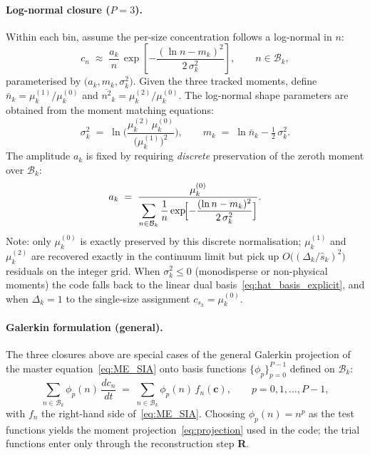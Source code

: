 \paragraph{Log-normal closure ($P{=}3$).}
\label{sec:lognormal_closure}
Within each bin, assume the per-size concentration follows a
log-normal in $n$:
\begin{equation}\label{eq:lognormal_ansatz}
    c_n
    \;\approx\;
    \frac{a_k}{n}\,\exp\!\left[
      -\frac{(\ln n - m_k)^2}{2\,\sigma_k^2}
    \right],
    \qquad n \in \mathcal{B}_k,
\end{equation}
parameterised by $\bigl(a_k, m_k, \sigma_k^2\bigr)$. Given the three
tracked moments, define
$\bar{n}_k = \mu_k^{(1)}/\mu_k^{(0)}$ and
$\overline{n^2}_k = \mu_k^{(2)}/\mu_k^{(0)}$. The log-normal shape
parameters are obtained from the moment matching equations:
\begin{equation}\label{eq:lognormal_params}
    \sigma_k^2 \;=\; \ln\!\Biggl(
      \frac{\mu_k^{(2)}\,\mu_k^{(0)}}{\bigl(\mu_k^{(1)}\bigr)^{\!2}}
    \Biggr),
    \qquad
    m_k \;=\; \ln \bar{n}_k - \tfrac{1}{2}\,\sigma_k^2.
\end{equation}
The amplitude $a_k$ is fixed by requiring \emph{discrete} preservation
of the zeroth moment over $\mathcal{B}_k$:
\begin{equation}\label{eq:lognormal_norm}
    a_k \;=\; \frac{\mu_k^{(0)}}
        {\displaystyle
         \sum_{n \in \mathcal{B}_k}
           \frac{1}{n}
           \exp\!\Bigl[-\dfrac{(\ln n - m_k)^2}{2\,\sigma_k^2}\Bigr]}.
\end{equation}
Note: only $\mu_k^{(0)}$ is exactly preserved by this discrete
normalisation; $\mu_k^{(1)}$ and $\mu_k^{(2)}$ are recovered exactly
in the continuum limit but pick up
$O\!\bigl((\Delta_k / \hat{s}_k)^2\bigr)$ residuals on the integer
grid. When $\sigma_k^2 \le 0$ (monodisperse or non-physical
moments) the code falls back to the linear dual
basis~\eqref{eq:hat_basis_explicit}, and when $\Delta_k = 1$ to the
single-size assignment $c_{s_k} = \mu_k^{(0)}$.

\paragraph{Galerkin formulation (general).}
\label{sec:galerkin}
The three closures above are special cases of the general Galerkin
projection of the master equation~\eqref{eq:ME_SIA} onto basis
functions $\{\phi_p\}_{p=0}^{P-1}$ defined on $\mathcal{B}_k$:
\begin{equation}\label{eq:galerkin}
    \sum_{n \in \mathcal{B}_k}
      \phi_p(n)\,\frac{dc_n}{dt}
    \;=\;
    \sum_{n \in \mathcal{B}_k}
      \phi_p(n)\,f_n(\mathbf{c}),
    \qquad p = 0, 1, \ldots, P-1,
\end{equation}
with $f_n$ the right-hand side of~\eqref{eq:ME_SIA}. Choosing
$\phi_p(n) = n^p$ as the test functions yields the moment
projection~\eqref{eq:projection} used in the code; the trial
functions enter only through the reconstruction step \textbf{R}.


